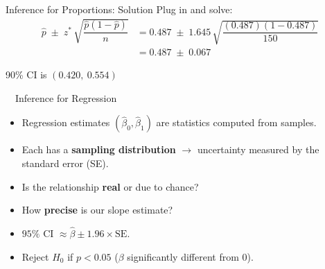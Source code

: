 \documentclass[aspectratio=169,11pt]{beamer}
\begin{document}
\begin{frame}{Inference for Proportions: Solution}
  Plug in and solve:
  \vspace{0.4em}
  \begin{align*}
    \hat{p} \;\pm\; z^{*}\,\sqrt{\dfrac{\hat{p}(1-\hat{p})}{n}}
      &= 0.487 \;\pm\; 1.645\,\sqrt{\dfrac{(0.487)(1-0.487)}{150}}\\[0.5em]
      &= 0.487 \;\pm\; 0.067
  \end{align*}
  \vspace{0.2em}
  \begin{center}
    \begin{tcolorbox}[colback=qrlight,colframe=qrnavy,arc=2pt,boxrule=0.6pt,width=0.7\textwidth,halign=center]
      90\% CI is $(0.420,\ 0.554)$
    \end{tcolorbox}
  \end{center}
\end{frame}

\begin{frame}{\ \ Inference for Regression}
  \begin{itemize}
    \item Regression estimates $(\hat{\beta}_0,\hat{\beta}_1)$ are statistics
          computed from samples.
    \item Each has a \textbf{sampling distribution} $\rightarrow$ uncertainty
          measured by the standard error (SE).
  \end{itemize}
  \vspace{0.3em}
  \begin{keybox}
    \begin{itemize}
      \item Is the relationship \textbf{real} or due to chance?
      \item How \textbf{precise} is our slope estimate?
    \end{itemize}
  \end{keybox}
  \vspace{0.3em}
  \begin{itemize}
    \item $95\%$ CI $\approx \hat{\beta} \pm 1.96 \times \text{SE}$.
    \item Reject $H_0$ if $p < 0.05$ ($\beta$ significantly different from $0$).
  \end{itemize}
\end{frame}
\end{document}
